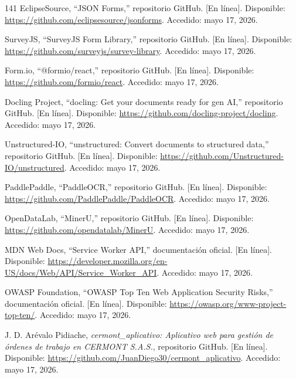 \begin{thebibliography}{141}
EclipseSource, ``JSON Forms,'' repositorio GitHub. [En línea]. Disponible: \url{https://github.com/eclipsesource/jsonforms}. Accedido: mayo 17, 2026.

SurveyJS, ``SurveyJS Form Library,'' repositorio GitHub. [En línea]. Disponible: \url{https://github.com/surveyjs/survey-library}. Accedido: mayo 17, 2026.

Form.io, ``@formio/react,'' repositorio GitHub. [En línea]. Disponible: \url{https://github.com/formio/react}. Accedido: mayo 17, 2026.

Docling Project, ``docling: Get your documents ready for gen AI,'' repositorio GitHub. [En línea]. Disponible: \url{https://github.com/docling-project/docling}. Accedido: mayo 17, 2026.

Unstructured-IO, ``unstructured: Convert documents to structured data,'' repositorio GitHub. [En línea]. Disponible: \url{https://github.com/Unstructured-IO/unstructured}. Accedido: mayo 17, 2026.

PaddlePaddle, ``PaddleOCR,'' repositorio GitHub. [En línea]. Disponible: \url{https://github.com/PaddlePaddle/PaddleOCR}. Accedido: mayo 17, 2026.

OpenDataLab, ``MinerU,'' repositorio GitHub. [En línea]. Disponible: \url{https://github.com/opendatalab/MinerU}. Accedido: mayo 17, 2026.

MDN Web Docs, ``Service Worker API,'' documentación oficial. [En línea]. Disponible: \url{https://developer.mozilla.org/en-US/docs/Web/API/Service_Worker_API}. Accedido: mayo 17, 2026.

OWASP Foundation, ``OWASP Top Ten Web Application Security Risks,'' documentación oficial. [En línea]. Disponible: \url{https://owasp.org/www-project-top-ten/}. Accedido: mayo 17, 2026.

J. D. Arévalo Pidiache, \textit{cermont\_aplicativo: Aplicativo web para gestión de órdenes de trabajo en CERMONT S.A.S.}, repositorio GitHub. [En línea]. Disponible: \url{https://github.com/JuanDiego30/cermont_aplicativo}. Accedido: mayo 17, 2026.

\end{thebibliography}
